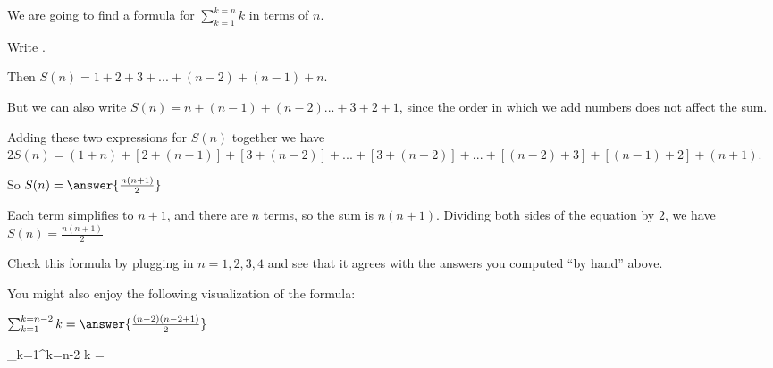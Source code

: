 \documentclass{ximera}
\begin{document}
\begin{question}
	We are going to find a formula for $\sum_{k=1}^{k=n} k$ in terms of $n$.
	
	Write  .
	
	Then $S(n) = 1+2+3+...+(n-2)+(n-1)+n$.
	
	But we can also write $S(n) = n+(n-1)+(n-2)...+3+2+1$, since the order in which we add numbers does not affect the sum.
	
	Adding these two expressions for $S(n)$ together we have $2S(n) = (1+n)+[2+(n-1)]+[3+(n-2)]+...+[3+(n-2)]+...+[(n-2)+3]+[(n-1)+2]+(n+1)$.
		
	So $S(n) = \answer{\frac{n(n+1)}{2}}$ 
	 \begin{hint}
	 	 Each term simplifies to $n+1$, and there are $n$ terms, so the sum is $n(n+1)$.  Dividing both sides of the equation by $2$, we have $S(n) = \frac{n(n+1)}{2}$
	 \end{hint}
	 
	 Check this formula by plugging in $n=1,2,3,4$ and see that it agrees with the answers you computed ``by hand'' above.
	 
	 \begin{multiple-choice}
	 \end{multiple-choice}
	 
	 You might also enjoy the following visualization of the formula:
	 
\end{question}

\begin{question}
	$\sum_{k=1}^{k=n-2} k = \answer{ \frac{(n-2)(n-2+1)}{2} }$
	\begin{hint}
		\sum_{k=1}^{k=n-2} k =  
	\end{hint}
\end{question}
\end{document}
